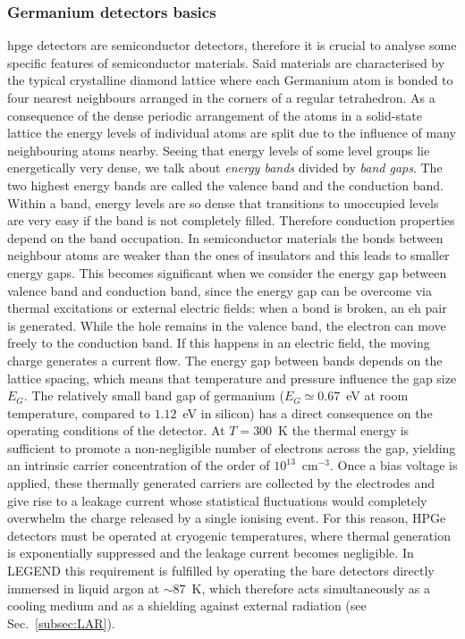 \subsubsection{Germanium detectors basics}
\ac{hpge} detectors are semiconductor detectors, therefore it is crucial to analyse some specific features of semiconductor materials.
Said materials are characterised by the typical crystalline diamond lattice where each Germanium atom is bonded to four nearest neighbours arranged in the corners of a regular tetrahedron. As a consequence of the dense periodic arrangement of the atoms in a solid-state lattice the energy levels of individual atoms are split due to the influence of many neighbouring atoms nearby. Seeing that energy levels of some level groups lie energetically very dense, we talk about \textit{energy bands} divided by \textit{band gaps}.
The two highest energy bands are called the valence band and the conduction band. Within a band, energy levels are so dense that transitions to unoccupied levels are very easy if the band is not completely filled. Therefore conduction properties depend on the band occupation. In semiconductor materials the bonds between neighbour atoms are weaker than the ones of insulators and this leads to smaller energy gaps. This becomes significant when we consider the energy gap between valence band and conduction band, since the energy gap can be overcome via thermal excitations or external electric fields: when a bond is broken, an \ac{eh} pair is generated. While the hole remains in the valence band, the electron can move freely to the conduction band. If this happens in an electric field, the moving charge generates a current flow. The energy gap between bands depends on the lattice spacing, which means that temperature and pressure influence the gap size $E_G$.
The relatively small band gap of germanium ($E_G \simeq 0.67$~eV at room temperature, compared to $1.12$~eV in silicon) has a direct consequence on the operating conditions of the detector. At $T = 300$~K the thermal energy is sufficient to promote a non-negligible number of electrons across the gap, yielding an intrinsic carrier concentration of the order of $10^{13}$~cm$^{-3}$. Once a bias voltage is applied, these thermally generated carriers are collected by the electrodes and give rise to a leakage current whose statistical fluctuations would completely overwhelm the charge released by a single ionising event. For this reason, HPGe detectors must be operated at cryogenic temperatures, where thermal generation is exponentially suppressed and the leakage current becomes negligible. In LEGEND this requirement is fulfilled by operating the bare detectors directly immersed in liquid argon at $\sim 87$~K, which therefore acts simultaneously as a cooling medium and as a shielding against external radiation (see Sec.~\ref{subsec:LAR}).

